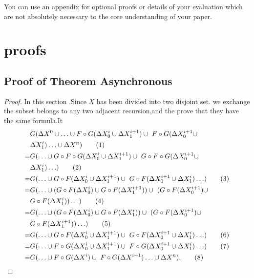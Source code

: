 \begin{appendix}
You can use an appendix for optional proofs or details of your evaluation which are not absolutely necessary to the core understanding of your paper.
\section{proofs}
\subsection{Proof of Theorem Asynchronous}
 \begin{proof}
 \label{sec:app:proof:correct}
 In this section .Since $X$ has been divided into two disjoint set. we exchange the subset belongs to any two adjacent recursion,and the prove that they have the same formula.It
 \begin{align}
 &G(\Delta X^0\cup \ldots \cup F\circ G(\Delta X^i_0 \cup \Delta X^{i+1}_1)\cup\ F\circ G(\Delta X^{i+1}_0 \cup \notag\\ &\Delta X^{i}_1) \ldots\cup \Delta X^n)\tag{1} \\
 =&G( \ldots \cup G \circ F\circ G(\Delta X^i_0 \cup \Delta X^{i+1}_1)\cup\ G \circ F\circ G(\Delta X^{i+1}_0 \cup \notag\\ &\Delta X^{i}_1) \ldots)\tag{2} \\
 =&G( \ldots \cup G \circ F(\Delta X^i_0 \cup \Delta X^{i+1}_1)\cup\ G \circ F(\Delta X^{i+1}_0 \cup \Delta X^{i}_1) \ldots)\tag{3} \\
  =&G( \ldots \cup (G\circ F(\Delta X^i_0) \cup G\circ F(\Delta X^{i+1}_1))\cup\ (G \circ F(\Delta X^{i+1}_0) \cup \notag\\ &G \circ F(\Delta X^{i}_1)) \ldots )\tag{4} \\
  =&G( \ldots \cup (G\circ F(\Delta X^i_0) \cup G\circ F(\Delta X^{i}_1))\cup\ (G \circ F(\Delta X^{i+1}_0) \cup \notag\\ &G \circ F(\Delta X^{i+1}_1)) \ldots )\tag{5} \\
  =&G( \ldots \cup G \circ F(\Delta X^i_0 \cup \Delta X^{i+1}_1)\cup\ G \circ F(\Delta X^{i+1}_0 \cup \Delta X^{i}_1) \ldots)\tag{6} \\
  =&G( \ldots \cup F \circ G(\Delta X^i_0 \cup \Delta X^{i+1}_1)\cup\ F \circ G(\Delta X^{i+1}_0 \cup \Delta X^{i}_1) \ldots)\tag{7} \\
=&G(\ldots \cup F \circ G(\Delta X^i)\cup\ F \circ G(\Delta X^{i+1}) \ldots\cup \Delta X^n).\tag{8}
 \end{align}


\end{proof}
\end{appendix}
